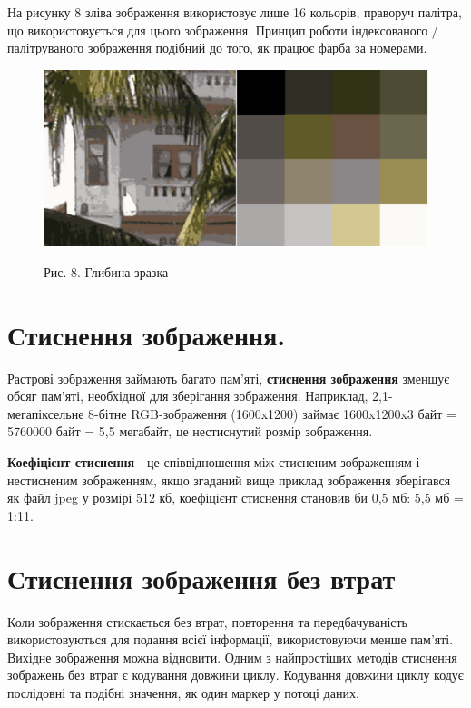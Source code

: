 \documentclass[a4paper,12pt]{article}
\begin{document}
    На рисунку 8 зліва зображення використовує лише 16 кольорів, праворуч палітра, що використовується для цього зображення.
    Принцип роботи індексованого / палітруваного зображення подібний до того, як працює фарба за номерами.

    \begin{figure}
        \label{fig:image8}
        \centering
        \includegraphics[scale=0.5]{image8.png}

        Рис. 8. Глибина зразка
    \end{figure}


    \section{Стиснення зображення.}\label{sec:image_compression}
    Растрові зображення займають багато пам'яті, \textbf{стиснення зображення} зменшує обсяг пам'яті, необхідної для зберігання зображення.
    Наприклад, 2,1-мегапіксельне 8-бітне RGB-зображення (1600x1200) займає 1600x1200x3 байт = 5760000 байт = 5,5 мегабайт, це нестиснутий розмір зображення.

    \textbf{Коефіцієнт стиснення} - це співвідношення між стисненим зображенням і нестисненим зображенням, якщо згаданий вище приклад зображення зберігався як файл jpeg у розмірі 512 кб, коефіцієнт стиснення становив би 0,5 мб: 5,5 мб = 1:11.


    \section{Стиснення зображення без втрат}\label{sec:lossless_image_compression}
    Коли зображення стискається без втрат, повторення та передбачуваність використовуються для подання всієї інформації, використовуючи менше пам'яті.
    Вихідне зображення можна відновити.
    Одним з найпростіших методів стиснення зображень без втрат є кодування довжини циклу.
    Кодування довжини циклу кодує послідовні та подібні значення, як один маркер у потоці даних.
\end{document}
